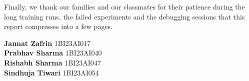 {Finally, we thank our families and our classmates for their patience during the
long training runs, the failed experiments and the debugging sessions that this
report compresses into a few pages.

}

\vspace{18pt}

\noindent
{\fontsize{12}{16}\selectfont{}
\hfill\begin{minipage}{0.45\textwidth}\raggedright
\textbf{Jannat Zafrin} \hfill 1BI23AI017\\
\textbf{Prabhav Sharma} \hfill 1BI23AI040\\
\textbf{Rishabh Sharma} \hfill 1BI23AI047\\
\textbf{Sindhuja Tiwari} \hfill 1BI23AI054
\end{minipage}}

\clearpage
